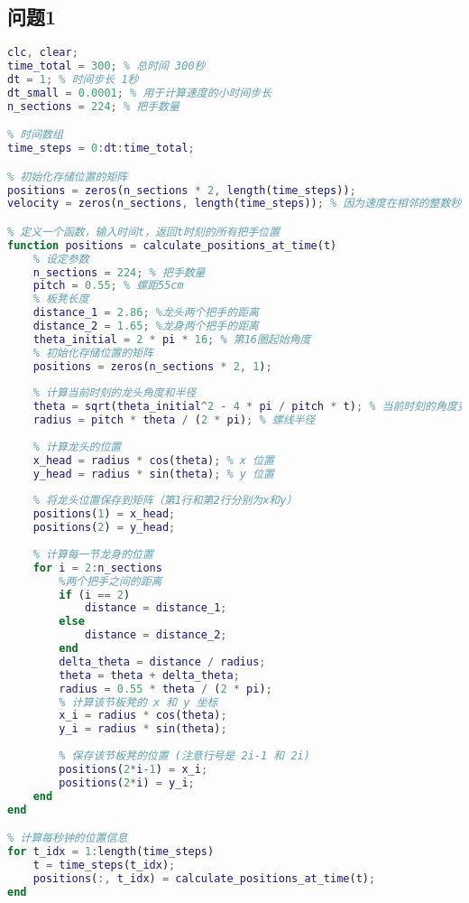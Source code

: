 \documentclass[withoutpreface,bwprint]{cumcmthesis1} %
\begin{document}
\begin{appendices}

\section{\textbf{问题1}}


\begin{lstlisting}[language=matlab]
   clc, clear;
time_total = 300; % 总时间 300秒
dt = 1; % 时间步长 1秒
dt_small = 0.0001; % 用于计算速度的小时间步长
n_sections = 224; % 把手数量

% 时间数组
time_steps = 0:dt:time_total;

% 初始化存储位置的矩阵
positions = zeros(n_sections * 2, length(time_steps)); 
velocity = zeros(n_sections, length(time_steps)); % 因为速度在相邻的整数秒之间计算

% 定义一个函数，输入时间t，返回t时刻的所有把手位置
function positions = calculate_positions_at_time(t)
    % 设定参数
    n_sections = 224; % 把手数量
    pitch = 0.55; % 螺距55cm
    % 板凳长度
    distance_1 = 2.86; %龙头两个把手的距离
    distance_2 = 1.65; %龙身两个把手的距离
    theta_initial = 2 * pi * 16; % 第16圈起始角度
    % 初始化存储位置的矩阵
    positions = zeros(n_sections * 2, 1);
    
    % 计算当前时刻的龙头角度和半径
    theta = sqrt(theta_initial^2 - 4 * pi / pitch * t); % 当前时刻的角度变化
    radius = pitch * theta / (2 * pi); % 螺线半径
    
    % 计算龙头的位置
    x_head = radius * cos(theta); % x 位置
    y_head = radius * sin(theta); % y 位置
    
    % 将龙头位置保存到矩阵（第1行和第2行分别为x和y）
    positions(1) = x_head;
    positions(2) = y_head;
    
    % 计算每一节龙身的位置
    for i = 2:n_sections
        %两个把手之间的距离
        if (i == 2)
            distance = distance_1;
        else
            distance = distance_2;
        end
        delta_theta = distance / radius;
        theta = theta + delta_theta;
        radius = 0.55 * theta / (2 * pi);
        % 计算该节板凳的 x 和 y 坐标
        x_i = radius * cos(theta);
        y_i = radius * sin(theta);
        
        % 保存该节板凳的位置 (注意行号是 2i-1 和 2i)
        positions(2*i-1) = x_i;
        positions(2*i) = y_i;
    end
end

% 计算每秒钟的位置信息
for t_idx = 1:length(time_steps)
    t = time_steps(t_idx);
    positions(:, t_idx) = calculate_positions_at_time(t);
end


\end{lstlisting}
\end{appendices}
\end{document}
